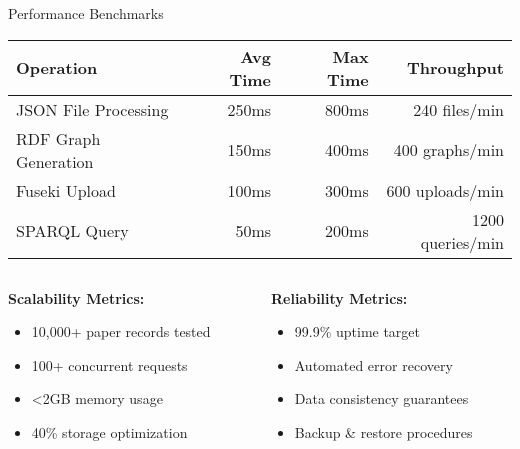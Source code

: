 \documentclass[aspectratio=169]{beamer}
\begin{document}
\begin{frame}{Performance Benchmarks}
    \begin{table}[h]
        \centering
        \begin{tabular}{|l|r|r|r|}
            \hline
            \rowcolor{primaryblue!20}
            \textbf{Operation} & \textbf{Avg Time} & \textbf{Max Time} & \textbf{Throughput} \\
            \hline
            JSON File Processing & 250ms & 800ms & 240 files/min \\
            \hline
            RDF Graph Generation & 150ms & 400ms & 400 graphs/min \\
            \hline
            Fuseki Upload & 100ms & 300ms & 600 uploads/min \\
            \hline
            SPARQL Query & 50ms & 200ms & 1200 queries/min \\
            \hline
        \end{tabular}
    \end{table}
    
    \vspace{0.5cm}
    
    \begin{columns}[c]
        \begin{column}{0.5\textwidth}
            \textbf{Scalability Metrics:}
            \begin{itemize}
                \item 10,000+ paper records tested
                \item 100+ concurrent requests
                \item <2GB memory usage
                \item 40\% storage optimization
            \end{itemize}
        \end{column}
        \begin{column}{0.5\textwidth}
            \textbf{Reliability Metrics:}
            \begin{itemize}
                \item 99.9\% uptime target
                \item Automated error recovery
                \item Data consistency guarantees
                \item Backup \& restore procedures
            \end{itemize}
        \end{column}
    \end{columns}
\end{frame}
\end{document}
